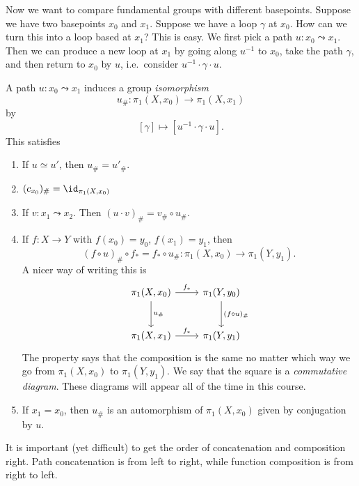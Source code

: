 \documentclass[a4paper]{article}
\begin{document}
Now we want to compare fundamental groups with different basepoints. Suppose we have two basepoints $x_0$ and $x_1$. Suppose we have a loop $\gamma$ at $x_0$. How can we turn this into a loop based at $x_1$? This is easy. We first pick a path $u: x_0 \leadsto x_1$. Then we can produce a new loop at $x_1$ by going along $u^{-1}$ to $x_0$, take the path $\gamma$, and then return to $x_0$ by $u$, i.e.\ consider $u^{-1}\cdot \gamma\cdot u$.
\begin{center}
\end{center}

\begin{prop}
  A path $u: x_0 \leadsto x_1$ induces a group \emph{isomorphism}
  \[
    u_\#: \pi_1(X, x_0) \to \pi_1(X, x_1)
  \]
  by
  \[
    [\gamma] \mapsto [u^{-1}\cdot \gamma \cdot u].
  \]
  This satisfies
  \begin{enumerate}
    \item If $u\simeq u'$, then $u_\# = u'_\#$.
    \item $(c_{x_0})_\# = \id_{\pi_1(X, x_0)}$
    \item If $v: x_1 \leadsto x_2$. Then $(u\cdot v)_\# = v_\# \circ u_\#$.
    \item If $f: X\to Y$ with $f(x_0) = y_0$, $f(x_1) = y_1$, then
      \[
        (f\circ u)_\# \circ f_* = f_* \circ u_\#: \pi_1(X, x_0) \to \pi_1(Y, y_1).
      \]
      A nicer way of writing this is
      \[
        \begin{tikzcd}[row sep=large]
          \pi_1(X, x_0) \ar[r, "f_*"] \ar[d, "u_\#"] & \pi_1(Y, y_0)\ar [d, "(f\circ u)_\#"]\\
          \pi_1(X, x_1) \ar[r, "f_*"] & \pi_1(Y, y_1)
        \end{tikzcd}
      \]
      The property says that the composition is the same no matter which way we go from $\pi_1(X, x_0)$ to $\pi_1(Y, y_1)$. We say that the square is a \emph{commutative diagram}. These diagrams will appear all of the time in this course.
    \item If $x_1 = x_0$, then $u_\#$ is an automorphism of $\pi_1(X, x_0)$ given by conjugation by $u$.
  \end{enumerate}
\end{prop}
It is important (yet difficult) to get the order of concatenation and composition right. Path concatenation is from left to right, while function composition is from right to left.
\end{document}
